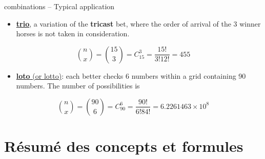 \documentclass[ignorenonframetext,]{beamer}
\providecommand{\tightlist}{%
  \setlength{\itemsep}{0pt}\setlength{\parskip}{0pt}}
\begin{document}
\begin{frame}{combinations -- Typical application}
\protect\hypertarget{combinations-typical-application}{}

\begin{itemize}
\tightlist
\item
  \href{https://en.wikipedia.org/wiki/Trifecta}{\textbf{trio}}, a
  variation of the \textbf{tricast} bet, where the order of arrival of
  the 3 winner horses is not taken in consideration.
\end{itemize}

\[\binom{n}{x} = \binom{15}{3} = C^3_{15} = \frac{15!}{3! 12!} = 455\]

\begin{itemize}
\tightlist
\item
  \href{https://fr.wikipedia.org/wiki/Loto}{\textbf{loto} (or lotto)}:
  each better checks 6 numbers within a grid containing 90 numbers. The
  number of possibilities is
\end{itemize}

\[\binom{n}{x} = \binom{90}{6} = C^6_{90} = \frac{90!}{6! 84!} = \ensuremath{6.2261463\times 10^{8}}\]

\end{frame}

\hypertarget{resume-des-concepts-et-formules}{%
\section{Résumé des concepts et
formules}\label{resume-des-concepts-et-formules}}
\end{document}
